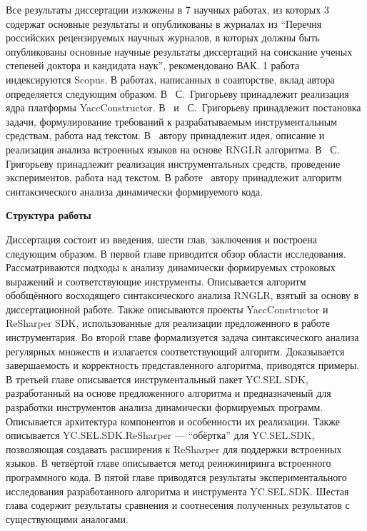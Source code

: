 Все результаты диссертации изложены в 7 научных работах, из которых 3~\cite{YCArticle,SELforIDEru,AbstractGLL} содержат основные результаты и опубликованы в журналах из ``Перечня российских рецензируемых научных журналов, в которых должны быть опубликованы основные научные результаты диссертаций на соискание ученых степеней доктора и кандидата наук'', рекомендовано ВАК. 
1 работа~\cite{GLRAbsPars} индексируются Scopus. В работах, написанных в соавторстве, вклад автора определяется следующим образом.  В~\cite{Syrcose} С.~Григорьеву принадлежит реализация ядра платформы YaccConstructor. В~\cite{SELforIDEru, AbstractGLL} и~\cite{SELforIDE} С.~Григорьеву принадлежит постановка задачи, формулирование требований к разрабатываемым инструментальным средствам, работа над текстом. 
В~\cite{GLRAbsPars} автору принадлежит идея, описание и реализация анализа встроенных языков на основе RNGLR алгоритма.  В~\cite{YCArticle} С. Григорьеву принадлежит реализация инструментальных средств, проведение экспериментов, работа над текстом. В работе~\cite{RelaxedARNGLR} автору принадлежит алгоритм синтаксического анализа динамически формируемого кода.


\textbf{Структура работы}

Диссертация состоит из введения, шести глав, заключения и построена следующим образом. В первой главе приводится обзор области исследования. Рассматриваются подходы к анализу динамически формируемых строковых выражений и соответствующие инструменты. Описывается алгоритм обобщённого восходящего синтаксического анализа RNGLR, взятый за основу в диссертационной работе. Также описываются проекты YaccConstructor и ReSharper SDK, использованные для реализации предложенного в работе инструментария. Во второй главе формализуется задача синтаксического анализа регулярных множеств и излагается соответствующий алгоритм. Доказывается завершаемость и корректность представленного алгоритма, приводятся примеры. В третьей главе описывается инструментальный пакет YC.SEL.SDK, разработанный на основе предложенного алгоритма и предназначеный для разработки инструментов анализа динамически формируемых программ. Описывается архитектура компонентов и особенности их реализации. Также описывается YC.SEL.SDK.ReSharper --- ``обёртка'' для YC.SEL.SDK, позволяющая создавать расширения к ReSharper для поддержки встроенных языков. В четвёртой главе описывается метод реинжиниринга встроенного программного кода.  В пятой главе приводятся результаты экспериментального исследования разработанного алгоритма и инструмента YC.SEL.SDK. Шестая глава содержит результаты сравнения и соотнесения полученных результатов с  существующими аналогами.

